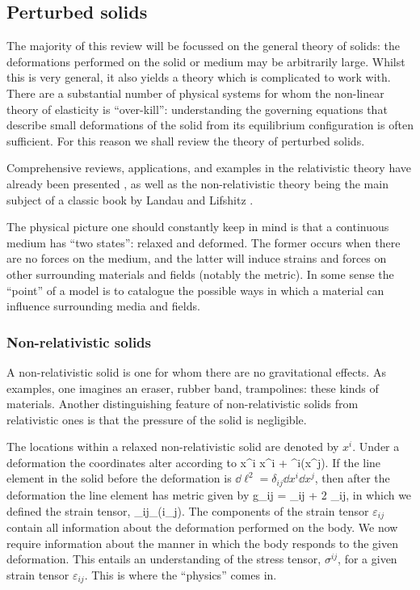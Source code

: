 \subsection{Perturbed solids}
The majority of this review will be focussed on the general theory of solids: the deformations performed on the solid or medium may be arbitrarily large. Whilst this is very general, it also yields a theory which is complicated to work with. There are a substantial number of physical systems for whom the non-linear theory of elasticity is ``over-kill'': understanding the governing equations that describe small deformations of the solid from its equilibrium configuration is often sufficient. For this reason we shall review the theory of perturbed solids.

Comprehensive reviews, applications, and examples in the relativistic theory have already been presented \cite{Carter:1973zz, Carter:1977qf, Bucher:1998mh, Battye:2005ik, Battye:2007aa, Battye:2013er, Pearson:2014iaa}, as well as the non-relativistic theory being the main subject of a classic book by Landau and Lifshitz \cite{ll_elast}.

The physical picture one should constantly keep in mind is that a continuous medium has ``two states'': relaxed and deformed. The former occurs when there are no forces on the medium, and the latter will induce strains and forces on other surrounding materials and fields (notably the metric). In some sense the ``point'' of a model is to catalogue the possible ways in which a material can influence surrounding media and fields. 



\subsubsection{Non-relativistic solids}
A non-relativistic solid is one for whom there are no gravitational effects. As examples, one imagines an eraser, rubber band, trampolines: these kinds of materials. Another distinguishing feature of non-relativistic solids from relativistic ones is that the pressure of the solid is negligible.

The locations within a relaxed non-relativistic solid are denoted by $x^i$. Under a deformation the coordinates alter according to 
\bea
x^i \longrightarrow x^i + \xi^i(x^j).
\eea
 If the line element in the solid before the deformation is $\dd\ell^2 = \delta_{ij} \dd x^i \dd x^j$, then after the deformation the line element has metric  given by
\bea
g_{ij} = \delta_{ij} + 2 \varepsilon_{ij},
\eea
in which we defined the strain tensor,
\bea
\label{non-rel-strain-defn}
\varepsilon_{ij} \partial_{(i}\xi_{j)}.
\eea
The components of the strain tensor $\varepsilon_{ij}$ contain all information about the deformation performed on the body. We now require information about the manner in which the body responds to the given deformation. This   entails   an understanding of the stress tensor, $\sigma^{ij}$, for a given strain tensor $\varepsilon_{ij}$. This is where the ``physics'' comes in.

